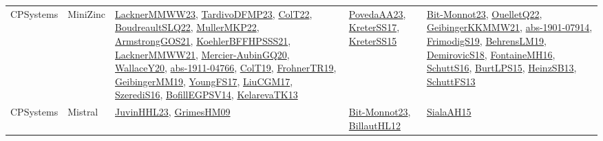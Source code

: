 {\begin{longtable}{lp{3cm}>{\raggedright}p{6cm}>{\raggedright}p{6cm}p{8cm}}
CPSystems & MiniZinc & \href{articles/LacknerMMWW23.pdf}{LacknerMMWW23}\cite{LacknerMMWW23}, \href{papers/TardivoDFMP23.pdf}{TardivoDFMP23}\cite{TardivoDFMP23}, \href{articles/ColT22.pdf}{ColT22}\cite{ColT22}, \href{papers/BoudreaultSLQ22.pdf}{BoudreaultSLQ22}\cite{BoudreaultSLQ22}, \href{articles/MullerMKP22.pdf}{MullerMKP22}\cite{MullerMKP22}, \href{papers/ArmstrongGOS21.pdf}{ArmstrongGOS21}\cite{ArmstrongGOS21}, \href{articles/KoehlerBFFHPSSS21.pdf}{KoehlerBFFHPSSS21}\cite{KoehlerBFFHPSSS21}, \href{papers/LacknerMMWW21.pdf}{LacknerMMWW21}\cite{LacknerMMWW21}, \href{papers/Mercier-AubinGQ20.pdf}{Mercier-AubinGQ20}\cite{Mercier-AubinGQ20}, \href{articles/WallaceY20.pdf}{WallaceY20}\cite{WallaceY20}, \href{articles/abs-1911-04766.pdf}{abs-1911-04766}\cite{abs-1911-04766}, \href{papers/ColT19.pdf}{ColT19}\cite{ColT19}, \href{papers/FrohnerTR19.pdf}{FrohnerTR19}\cite{FrohnerTR19}, \href{papers/GeibingerMM19.pdf}{GeibingerMM19}\cite{GeibingerMM19}, \href{papers/YoungFS17.pdf}{YoungFS17}\cite{YoungFS17}, \href{papers/LiuCGM17.pdf}{LiuCGM17}\cite{LiuCGM17}, \href{papers/SzerediS16.pdf}{SzerediS16}\cite{SzerediS16}, \href{papers/BofillEGPSV14.pdf}{BofillEGPSV14}\cite{BofillEGPSV14}, \href{papers/KelarevaTK13.pdf}{KelarevaTK13}\cite{KelarevaTK13} & \href{papers/PovedaAA23.pdf}{PovedaAA23}\cite{PovedaAA23}, \href{articles/KreterSS17.pdf}{KreterSS17}\cite{KreterSS17}, \href{papers/KreterSS15.pdf}{KreterSS15}\cite{KreterSS15} & \href{papers/Bit-Monnot23.pdf}{Bit-Monnot23}\cite{Bit-Monnot23}, \href{papers/OuelletQ22.pdf}{OuelletQ22}\cite{OuelletQ22}, \href{papers/GeibingerKKMMW21.pdf}{GeibingerKKMMW21}\cite{GeibingerKKMMW21}, \href{articles/abs-1901-07914.pdf}{abs-1901-07914}\cite{abs-1901-07914}, \href{papers/FrimodigS19.pdf}{FrimodigS19}\cite{FrimodigS19}, \href{papers/BehrensLM19.pdf}{BehrensLM19}\cite{BehrensLM19}, \href{papers/DemirovicS18.pdf}{DemirovicS18}\cite{DemirovicS18}, \href{papers/FontaineMH16.pdf}{FontaineMH16}\cite{FontaineMH16}, \href{papers/SchuttS16.pdf}{SchuttS16}\cite{SchuttS16}, \href{papers/BurtLPS15.pdf}{BurtLPS15}\cite{BurtLPS15}, \href{articles/HeinzSB13.pdf}{HeinzSB13}\cite{HeinzSB13}, \href{papers/SchuttFS13.pdf}{SchuttFS13}\cite{SchuttFS13}\\
CPSystems & Mistral & \href{papers/JuvinHHL23.pdf}{JuvinHHL23}\cite{JuvinHHL23}, \href{papers/GrimesHM09.pdf}{GrimesHM09}\cite{GrimesHM09} & \href{papers/Bit-Monnot23.pdf}{Bit-Monnot23}\cite{Bit-Monnot23}, \href{papers/BillautHL12.pdf}{BillautHL12}\cite{BillautHL12} & \href{papers/SialaAH15.pdf}{SialaAH15}\cite{SialaAH15}\\

\end{longtable}}
